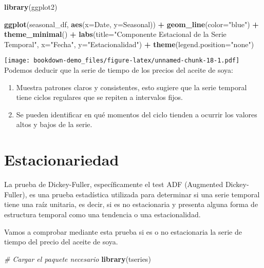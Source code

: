 \documentclass[
]{book}
\newenvironment{Shaded}{\begin{snugshade}}{\end{snugshade}}
\newcommand{\AttributeTok}[1]{\textcolor[rgb]{0.13,0.29,0.53}{#1}}
\newcommand{\CommentTok}[1]{\textcolor[rgb]{0.56,0.35,0.01}{\textit{#1}}}
\newcommand{\FunctionTok}[1]{\textcolor[rgb]{0.13,0.29,0.53}{\textbf{#1}}}
\newcommand{\NormalTok}[1]{#1}
\newcommand{\SpecialCharTok}[1]{\textcolor[rgb]{0.81,0.36,0.00}{\textbf{#1}}}
\newcommand{\StringTok}[1]{\textcolor[rgb]{0.31,0.60,0.02}{#1}}
\begin{document}
\begin{Shaded}
\begin{Highlighting}[]
\FunctionTok{library}\NormalTok{(ggplot2)}

\FunctionTok{ggplot}\NormalTok{(seasonal\_df, }\FunctionTok{aes}\NormalTok{(}\AttributeTok{x=}\NormalTok{Date, }\AttributeTok{y=}\NormalTok{Seasonal)) }\SpecialCharTok{+}
  \FunctionTok{geom\_line}\NormalTok{(}\AttributeTok{color=}\StringTok{"blue"}\NormalTok{) }\SpecialCharTok{+}
  \FunctionTok{theme\_minimal}\NormalTok{() }\SpecialCharTok{+}
  \FunctionTok{labs}\NormalTok{(}\AttributeTok{title=}\StringTok{"Componente Estacional de la Serie Temporal"}\NormalTok{, }\AttributeTok{x=}\StringTok{"Fecha"}\NormalTok{, }\AttributeTok{y=}\StringTok{"Estacionalidad"}\NormalTok{) }\SpecialCharTok{+}
  \FunctionTok{theme}\NormalTok{(}\AttributeTok{legend.position=}\StringTok{"none"}\NormalTok{)}
\end{Highlighting}
\end{Shaded}

\texttt{[image: bookdown-demo\_files/figure-latex/unnamed-chunk-18-1.pdf]}
Podemos deducir que la serie de tiempo de los precios del aceite de soya:

\begin{enumerate}
\def\labelenumi{\arabic{enumi}.}
\item
  Muestra patrones claros y consistentes, esto sugiere que la serie temporal tiene ciclos regulares que se repiten a intervalos fijos.
\item
  Se pueden identificar en qué momentos del ciclo tienden a ocurrir los valores altos y bajos de la serie.
\end{enumerate}

\hypertarget{estacionariedad}{%
\chapter{Estacionariedad}\label{estacionariedad}}

La prueba de Dickey-Fuller, específicamente el test ADF (Augmented Dickey-Fuller), es una prueba estadística utilizada para determinar si una serie temporal tiene una raíz unitaria, es decir, si es no estacionaria y presenta alguna forma de estructura temporal como una tendencia o una estacionalidad.

Vamos a comprobar mediante esta prueba si es o no estacionaria la serie de tiempo del precio del aceite de soya.

\begin{Shaded}
\begin{Highlighting}[]
\CommentTok{\# Cargar el paquete necesario}
\FunctionTok{library}\NormalTok{(tseries)}
\end{Highlighting}
\end{Shaded}
\end{document}

